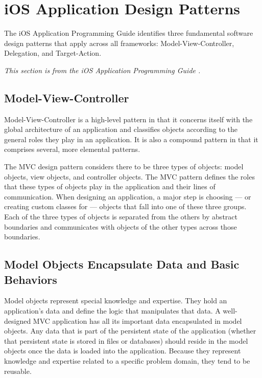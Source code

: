 \section{iOS Application Design Patterns}
\label{sect:cocoa}

The iOS Application Programming Guide identifies three fundamental software
design patterns that apply across all frameworks: Model-View-Controller,
Delegation, and Target-Action.

\emph{This section is from the iOS Application Programming Guide
\cite[p.~160--165]{ios:cocoa-fundamentals}.}

\subsection{Model-View-Controller}
\label{sect:cocoa_mvc}

Model-View-Controller is a high-level pattern in that it concerns itself
with the global architecture of an application and classifies objects
according to the general roles they play in an application. It is also a
compound pattern in that it comprises several, more elemental patterns.

The MVC design pattern considers there to be three types of objects: model
objects, view objects, and controller objects. The MVC pattern defines the
roles that these types of objects play in the application and their lines of
communication. When designing an application, a major step is choosing ---
or creating custom classes for --- objects that fall into one of these three
groups. Each of the three types of objects is separated from the others by
abstract boundaries and communicates with objects of the other types across
those boundaries.

\subsection{Model Objects Encapsulate Data and Basic Behaviors}

Model objects represent special knowledge and expertise. They hold an
application’s data and define the logic that manipulates that data. A
well-designed MVC application has all its important data encapsulated in model
objects. Any data that is part of the persistent state of the application
(whether that persistent state is stored in files or databases) should reside in
the model objects once the data is loaded into the application. Because they
represent knowledge and expertise related to a specific problem domain, they
tend to be reusable.

